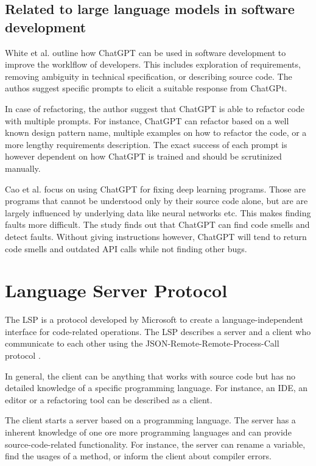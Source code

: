 \subsection{Related to large language models in software development}

White et al. \cite{White2023ChatGPTPP} outline how ChatGPT can be used in software development to improve the worklflow of developers. This includes  exploration of requirements, removing ambiguity in technical specification, or describing source code. The authos suggest specific prompts to elicit a suitable response from ChatGPt.

In case of refactoring, the author suggest that ChatGPT is able to refactor code with multiple prompts. For instance, ChatGPT can refactor based on a well known design pattern name, multiple examples on how to refactor the code, or a more lengthy requirements description. The exact success of each prompt is however dependent on how ChatGPT is trained and should be scrutinized manually. 

Cao et al. \cite{cao2023study} focus on using ChatGPT for fixing deep learning programs. Those are programs that cannot be understood only by their source code alone, but are are largely influenced by underlying data like  neural networks etc. This makes finding faults more difficult. The study finds out that ChatGPT can find code smells and detect faults. Without giving instructions however, ChatGPT will tend to return code smells and outdated API calls while not finding other bugs. 



\section{Language Server Protocol}
The \ac{LSP}  \cite{lsp_website} is a protocol developed by Microsoft to create a language-independent interface for code-related operations. 
The \ac{LSP}  describes a server and a client who communicate to each other using the JSON-Remote-Remote-Process-Call protocol \cite{json_rpc}. 

In general, the client can be anything that works with source code but has no detailed knowledge of a specific programming language. For instance, an \ac{IDE}, an editor or a refactoring tool can be described as a client.

The client starts a server based on a programming language. The server has a inherent knowledge of one ore more programming languages and can provide source-code-related functionality. For instance, the server can rename a variable, find the usages of a method, or inform the client about compiler errors. 

